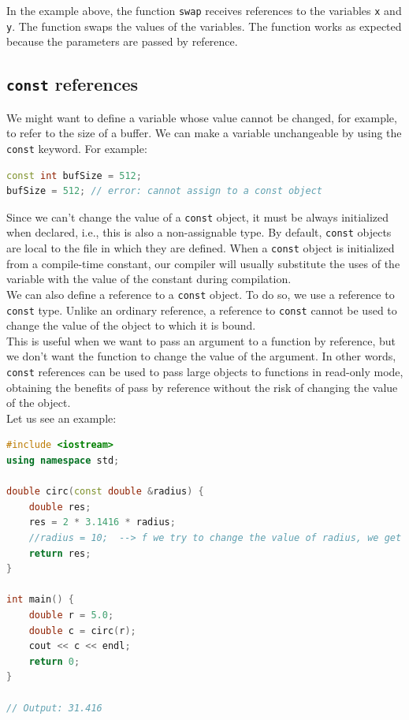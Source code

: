 In the example above, the function \texttt{swap} receives references to the
variables \texttt{x} and \texttt{y}. The function swaps the values of the
variables. The function works as expected because the parameters are passed by
reference.

\subsection{\texttt{const} references}

We might want to define a variable whose value cannot be changed, for example,
to refer to the size of a buffer. We can make a variable unchangeable by using
the \texttt{const} keyword. For example:\\

\begin{lstlisting}[language=C++]
const int bufSize = 512;
bufSize = 512; // error: cannot assign to a const object
\end{lstlisting}

Since we can't change the value of a \texttt{const} object, it must be always
initialized when declared, i.e., this is also a non-assignable type. 
By default, \texttt{const} objects are local to the
file in which they are defined. When a \texttt{const} object is initialized from 
a compile-time constant, our compiler will usually substitute the uses of the 
variable with the value of the constant during compilation.\\

We can also define a reference to a \texttt{const} object. To do so, we use a 
reference to \texttt{const} type. Unlike an ordinary reference, a reference to
\texttt{const} cannot be used to change the value of the object to which it is
bound.\\

This is useful when we want to pass an argument to a function by reference, 
but we don't want the function to change the value of the argument. In other
words, \texttt{const} references can be used to pass large objects to functions
in read-only mode, obtaining the benefits of pass by reference without the risk
of changing the value of the object.\\

Let us see an example:\\

\begin{lstlisting}[language=C++]
#include <iostream>
using namespace std;

double circ(const double &radius) {
    double res;
    res = 2 * 3.1416 * radius;
    //radius = 10;  --> f we try to change the value of radius, we get an error 
    return res;
}

int main() {
    double r = 5.0;
    double c = circ(r);
    cout << c << endl;
    return 0;
}

// Output: 31.416
\end{lstlisting}

